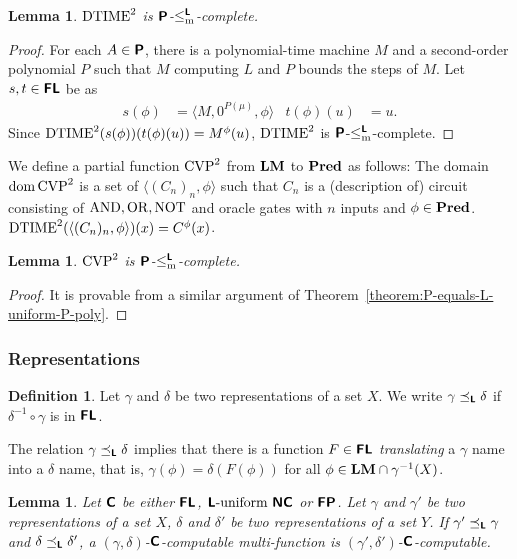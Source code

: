 \documentclass{article}
\newtheorem{lemma}[theorem]{Lemma}
\theoremstyle{definition}
\newtheorem{definition}[theorem]{Definition}
\theoremstyle{remark}
\begin{document}
\begin{lemma}
 $\mathrm{DTIME}^2$ is $\text{\bfseries \sffamily \upshape P}$-$\leq _{\mathrm{m}} ^{\text{\bfseries \sffamily \upshape L}}$-complete.
\end{lemma}

\begin{proof}
 For each $A \in \text{\bfseries \sffamily \upshape P}$, there is a polynomial-time machine $M$ and a second-order polynomial $P$ such that $M$ computing $L$ and $P$ bounds the steps of $M$.
 Let $s, t \in \text{\bfseries \sffamily \upshape FL}$ be as
 \begin{align}
  s(\phi) &= \langle M, 0^{P(\mu)}, \phi \rangle
  &
  t(\phi)(u) &= u.
 \end{align}
 Since  $\mathrm{DTIME}^2(s(\phi))(t(\phi)(u)) = M^\phi (u)$,
 $\mathrm{DTIME}^2$ is $\text{\bfseries \sffamily \upshape P}$-$\leq _{\mathrm{m}} ^{\text{\bfseries \sffamily \upshape L}}$-complete.
\end{proof}


We define a partial function  $\mathrm{CVP}^2$ from $\mathbf{LM}$ to $\mathbf{Pred}$ as follows:
The domain $\mathop{\rm dom} \mathrm{CVP}^2$ is a set of $\langle (C_n)_n, \phi \rangle$
such that $C_n$ is a (description of) circuit consisting of $\mathrm{AND}, \mathrm{OR}, \mathrm{NOT}$
and oracle gates with $n$ inputs and $\phi \in \mathbf{Pred}$.
$\mathrm{DTIME}^2(\langle (C_n)_n,  \phi \rangle)(x) = C^\phi(x)$.

\begin{lemma}
 $\mathrm{CVP}^2$ is $\text{\bfseries \sffamily \upshape P}$-$\leq _{\mathrm{m}} ^{\text{\bfseries \sffamily \upshape L}}$-complete.
\end{lemma}

\begin{proof}
 It is provable from a similar argument of Theorem~\ref{theorem:P-equals-L-uniform-P-poly}.
\end{proof}



\subsubsection{Representations}
\newcommand{\transL}{\preceq_\classLtwo}


\begin{definition}
Let $\gamma$ and $\delta$ be two representations of a set $X$.
We write $\gamma \transL \delta$ if
$\delta^{-1} \circ \gamma$ is in $\text{\bfseries \sffamily \upshape FL}$.
\end{definition}
The relation $\gamma \transL \delta$ implies that
there is a function $F \in \text{\bfseries \sffamily \upshape FL}$ \emph{translating} a $\gamma$ name
into a $\delta$ name, that is, $\gamma(\phi) = \delta(F(\phi))$ 
for all $\phi \in \mathbf{LM} \cap \gamma^{-1}(X)$.

\begin{lemma}
 Let $\text{\bfseries \sffamily \upshape C}$ be either $\text{\bfseries \sffamily \upshape FL}$, $\text{\bfseries \sffamily \upshape L}\text{-uniform}\ \text{\bfseries \sffamily \upshape NC}$ or
 $\text{\bfseries \sffamily \upshape FP}$.
 Let $\gamma$ and $\gamma'$ be two representations of a set $X$, 
 $\delta$ and $\delta'$ be two representations of a set $Y$.
 If $\gamma' \transL \gamma$ and $\delta \transL \delta'$,
 a $(\gamma, \delta)$-$\text{\bfseries \sffamily \upshape C}$-computable multi-function is
 $(\gamma', \delta')$-$\text{\bfseries \sffamily \upshape C}$-computable.
\end{lemma}
\end{document}
